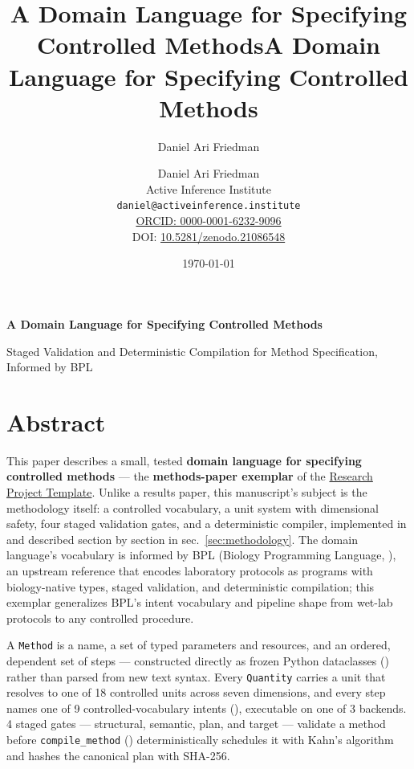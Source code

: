 \documentclass[
  english,
]{article}
\title{A Domain Language for Specifying Controlled Methods}
\author{Daniel Ari Friedman}
\date{}
\title{A Domain Language for Specifying Controlled Methods}
\author{Daniel Ari Friedman\\\footnotesize{Active Inference Institute}\\\footnotesize{\texttt{daniel@activeinference.institute}}\\\footnotesize{\href{https://orcid.org/0000-0001-6232-9096}{ORCID: 0000-0001-6232-9096}} \\ \footnotesize{DOI: \href{https://doi.org/10.5281/zenodo.21086548}{10.5281/zenodo.21086548}}}
\date{\today}
\begin{document}
\begin{titlepage}
\centering
\vspace*{2cm}
{\LARGE\bfseries A Domain Language for Specifying Controlled Methods\par}
\vspace{0.75em}
{\large Staged Validation and Deterministic Compilation for Method Specification, Informed by BPL\par}
\vfill
\makeatletter
{\@author\par}
\vspace{1em}
{\@date\par}
\makeatother
\vfill
\end{titlepage}
\thispagestyle{empty}
\tableofcontents
\newpage

\section{Abstract}\label{sec:abstract}

This paper describes a small, tested \textbf{domain language for
specifying controlled methods} --- the \textbf{methods-paper exemplar}
of the \href{https://github.com/docxology/template}{Research Project
Template}. Unlike a results paper, this manuscript's subject is the
methodology itself: a controlled vocabulary, a unit system with
dimensional safety, four staged validation gates, and a deterministic
compiler, implemented in
and described section by section in sec.~\ref{sec:methodology}. The
domain language's vocabulary is informed by BPL (Biology Programming
Language, \citep{bpl2026}), an upstream reference that encodes
laboratory protocols as programs with biology-native types, staged
validation, and deterministic compilation; this exemplar generalizes
BPL's intent vocabulary and pipeline shape from wet-lab protocols to any
controlled procedure.

A \texttt{Method} is a name, a set of typed parameters and resources,
and an ordered, dependent set of steps --- constructed directly as
frozen Python dataclasses () rather
than parsed from new text syntax. Every \texttt{Quantity} carries a unit
that resolves to one of 18 controlled units across seven dimensions, and
every step names one of 9 controlled-vocabulary intents
(), executable on one of 3
backends. 4 staged gates --- structural, semantic, plan, and target ---
validate a method before \texttt{compile\_method}
() deterministically schedules it
with Kahn's algorithm \citep{kahn1962topological} and hashes the
canonical plan with SHA-256.
\end{document}
